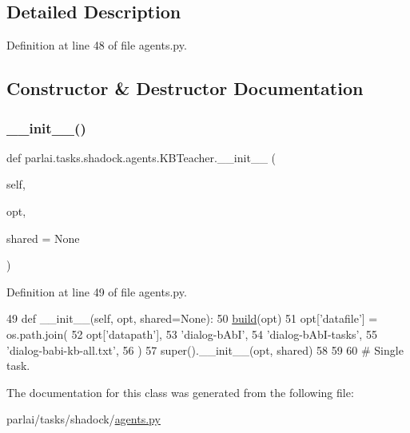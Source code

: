 \subsection{Detailed Description}


Definition at line 48 of file agents.\+py.



\subsection{Constructor \& Destructor Documentation}
\mbox{\label{classparlai_1_1tasks_1_1shadock_1_1agents_1_1KBTeacher_a4d1a61f6ca5d3aeea18b629573ea382e}} 
\subsubsection{\texorpdfstring{\+\_\+\+\_\+init\+\_\+\+\_\+()}{\_\_init\_\_()}}
{\footnotesize\ttfamily def parlai.\+tasks.\+shadock.\+agents.\+K\+B\+Teacher.\+\_\+\+\_\+init\+\_\+\+\_\+ (\begin{DoxyParamCaption}\item[{}]{self,  }\item[{}]{opt,  }\item[{}]{shared = {\ttfamily None} }\end{DoxyParamCaption})}



Definition at line 49 of file agents.\+py.


\begin{DoxyCode}
49     \textcolor{keyword}{def }\_\_init\_\_(self, opt, shared=None):
50         \hyperlink{namespaceparlai_1_1mturk_1_1tasks_1_1talkthewalk_1_1download_a8c0fbb9b6dfe127cb8c1bd6e7c4e33fd}{build}(opt)
51         opt[\textcolor{stringliteral}{'datafile'}] = os.path.join(
52             opt[\textcolor{stringliteral}{'datapath'}],
53             \textcolor{stringliteral}{'dialog-bAbI'},
54             \textcolor{stringliteral}{'dialog-bAbI-tasks'},
55             \textcolor{stringliteral}{'dialog-babi-kb-all.txt'},
56         )
57         super().\_\_init\_\_(opt, shared)
58 
59 
60 \textcolor{comment}{# Single task.}
\end{DoxyCode}


The documentation for this class was generated from the following file\+:\begin{DoxyCompactItemize}
\item 
parlai/tasks/shadock/\hyperlink{parlai_2tasks_2shadock_2agents_8py}{agents.\+py}\end{DoxyCompactItemize}
